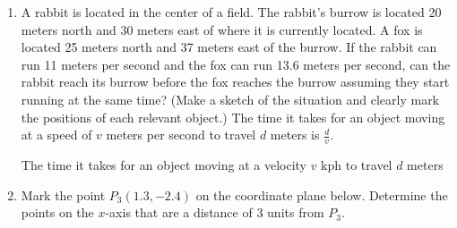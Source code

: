 \begin{enumerate}
\item A rabbit is located in the center of a field. The rabbit's
  burrow is located 20 meters north and 30 meters east of where it is
  currently located. A fox is located 25 meters north and 37 meters
  east of the burrow. If the rabbit can run 11 meters per second and
  the fox can run 13.6 meters per second, can the rabbit reach its
  burrow before the fox reaches the burrow assuming they start running
  at the same time? (Make a sketch of the situation and clearly mark
  the positions of each relevant object.) The time it takes for an
  object moving at a speed of $v$ meters per second to travel $d$
  meters is $\frac{d}{v}$.

  The time it takes for an object moving at a velocity $v$ kph to travel
  $d$ meters 

  \item Mark the point $P_3(1.3,-2.4)$ on the coordinate plane below. Determine the
  points on the $x$-axis that are a distance of 3 units from $P_3$.



\end{enumerate}
